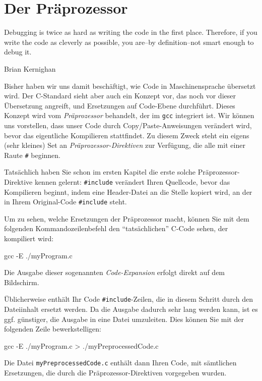 \chapter{Der Präprozessor} \label{chp:Preprocessor}
\epigraph{Debugging is twice as hard as writing the code in the first place. Therefore, if you write the code as cleverly as possible, you are–by definition–not smart enough to debug it.}
{Brian Kernighan}

Bisher haben wir uns damit beschäftigt, wie Code in Maschinensprache übersetzt wird. Der C-Standard sieht aber auch ein Konzept vor, das noch vor dieser Übersetzung angreift, und Ersetzungen auf Code-Ebene durchführt. Dieses Konzept wird vom \emph{Präprozessor} behandelt, der im \texttt{gcc} integriert ist. Wir können uns vorstellen, dass unser Code durch Copy/Paste-Anweisungen verändert wird, bevor das eigentliche Kompilieren stattfindet. Zu diesem Zweck steht ein eigens (sehr kleines) Set an \emph{Präprozessor-Direktiven} zur Verfügung, die alle mit einer Raute \texttt{\#} beginnen. 

Tatsächlich haben Sie schon im ersten Kapitel die erste solche Präprozessor-Direktive kennen gelernt: \texttt{#include} verändert Ihren Quellcode, bevor das Kompilieren beginnt, indem eine Header-Datei an die Stelle kopiert wird, an der in Ihrem Original-Code \texttt{#include} steht.

\begin{hintbox}
Um zu sehen, welche Ersetzungen der Präprozessor macht, können Sie mit dem folgenden Kommandozeilenbefehl den \enquote{tatsächlichen} C-Code sehen, der kompiliert wird:

\begin{cmdbox}[]
gcc -E ./myProgram.c
\end{cmdbox}

Die Ausgabe dieser sogenannten \emph{Code-Expansion} erfolgt direkt auf dem Bildschirm. 

Üblicherweise enthält Ihr Code \texttt{#include}-Zeilen, die in diesem Schritt durch den Dateiinhalt ersetzt werden. Da die Ausgabe dadurch sehr lang werden kann, ist es ggf. günstiger, die Ausgabe in eine Datei umzuleiten. Dies können Sie mit der folgenden Zeile bewerkstelligen:

\begin{cmdbox}[]
gcc -E ./myProgram.c > ./myPreprocessedCode.c
\end{cmdbox}

Die Datei \texttt{myPreprocessedCode.c} enthält dann Ihren Code, mit sämtlichen Ersetzungen, die durch die Präprozessor-Direktiven vorgegeben wurden.
\end{hintbox}

